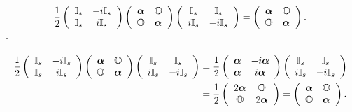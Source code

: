 \documentclass[aps,preprint]{revtex4}%
\begin{document}
\begin{equation}
\frac{1}{2}\left(
\begin{array}
[c]{cc}%
\mathbb{I}_{s} & -i\mathbb{I}_{s}\\
\mathbb{I}_{s} & i\mathbb{I}_{s}%
\end{array}
\right)  \left(
\begin{array}
[c]{cc}%
\boldsymbol{\alpha} & \mathbb{O}\\
\mathbb{O} & \boldsymbol{\alpha}%
\end{array}
\right)  \left(
\begin{array}
[c]{cc}%
\mathbb{I}_{s} & \mathbb{I}_{s}\\
i\mathbb{I}_{s} & -i\mathbb{I}_{s}%
\end{array}
\right)  =\left(
\begin{array}
[c]{cc}%
\boldsymbol{\alpha} & \mathbb{O}\\
\mathbb{O} & \boldsymbol{\alpha}%
\end{array}
\right)  .
\end{equation}
$\lceil$%
\begin{align}
\frac{1}{2}\left(
\begin{array}
[c]{cc}%
\mathbb{I}_{s} & -i\mathbb{I}_{s}\\
\mathbb{I}_{s} & i\mathbb{I}_{s}%
\end{array}
\right)  \left(
\begin{array}
[c]{cc}%
\boldsymbol{\alpha} & \mathbb{O}\\
\mathbb{O} & \boldsymbol{\alpha}%
\end{array}
\right)  \left(
\begin{array}
[c]{cc}%
\mathbb{I}_{s} & \mathbb{I}_{s}\\
i\mathbb{I}_{s} & -i\mathbb{I}_{s}%
\end{array}
\right)   &  =\frac{1}{2}\left(
\begin{array}
[c]{cc}%
\boldsymbol{\alpha} & -i\boldsymbol{\alpha}\\
\boldsymbol{\alpha} & i\boldsymbol{\alpha}%
\end{array}
\right)  \left(
\begin{array}
[c]{cc}%
\mathbb{I}_{s} & \mathbb{I}_{s}\\
i\mathbb{I}_{s} & -i\mathbb{I}_{s}%
\end{array}
\right) \\
&  =\frac{1}{2}\left(
\begin{array}
[c]{cc}%
2\boldsymbol{\alpha} & \mathbb{O}\\
\mathbb{O} & 2\boldsymbol{\alpha}%
\end{array}
\right)  =\left(
\begin{array}
[c]{cc}%
\boldsymbol{\alpha} & \mathbb{O}\\
\mathbb{O} & \boldsymbol{\alpha}%
\end{array}
\right)  .
\end{align}
\end{document}
